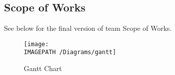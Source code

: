 \subsection{Scope of Works}
See below for the final version of team \ID Scope of Works.

\begin{landscape}
\vspace*{20pt}
\begin{figure}[!ht]
	\centering
	\texttt{[image: \\IMAGEPATH /Diagrams/gantt]}
	\caption{\ID Gantt Chart}
	\label{fig:gantt}
\end{figure}
\end{landscape}

\iffinal

\fi